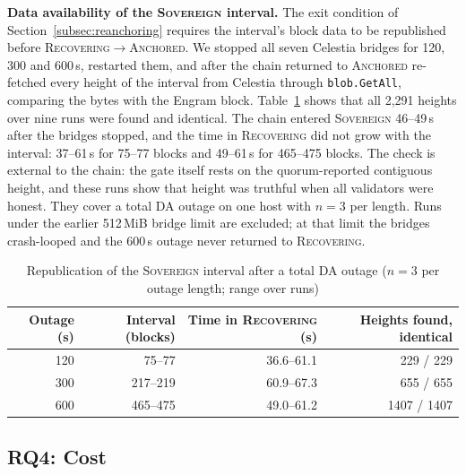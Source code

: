 \textbf{Data availability of the \textsc{Sovereign} interval.} The exit
condition of Section~\ref{subsec:reanchoring} requires the interval's block
data to be republished before \textsc{Recovering}$\to$\textsc{Anchored}. We
stopped all seven Celestia bridges for 120, 300 and 600\,s, restarted them, and
after the chain returned to \textsc{Anchored} re-fetched every height of the
interval from Celestia through \texttt{blob.GetAll}, comparing the bytes with
the Engram block. Table~\ref{tab:backfill} shows that all 2{,}291 heights over
nine runs were found and identical. The chain entered \textsc{Sovereign}
46--49\,s after the bridges stopped, and the time in \textsc{Recovering} did
not grow with the interval: 37--61\,s for 75--77 blocks and 49--61\,s for
465--475 blocks. The check is external to the chain: the gate itself rests on the
quorum-reported contiguous height, and these runs show that height was truthful
when all validators were honest. They cover a total DA outage on one host
with $n{=}3$ per length. Runs under the earlier 512\,MiB bridge limit are
excluded; at that limit the bridges crash-looped and the 600\,s outage never
returned to \textsc{Recovering}.

\begin{table}[h]
\caption{Republication of the \textsc{Sovereign} interval after a total DA
outage ($n{=}3$ per outage length; range over runs)}
\label{tab:backfill}
\centering
\footnotesize
\begin{tabular}{@{}rrrr@{}}
\toprule
\textbf{Outage (s)} & \textbf{Interval (blocks)} & \textbf{Time in \textsc{Recovering} (s)} & \textbf{Heights found, identical} \\
\midrule
120 & 75--77 & 36.6--61.1 & 229 / 229 \\
300 & 217--219 & 60.9--67.3 & 655 / 655 \\
600 & 465--475 & 49.0--61.2 & 1407 / 1407 \\
\bottomrule
\end{tabular}
\end{table}

\subsection{RQ4: Cost}
\label{subsec:rq4}

